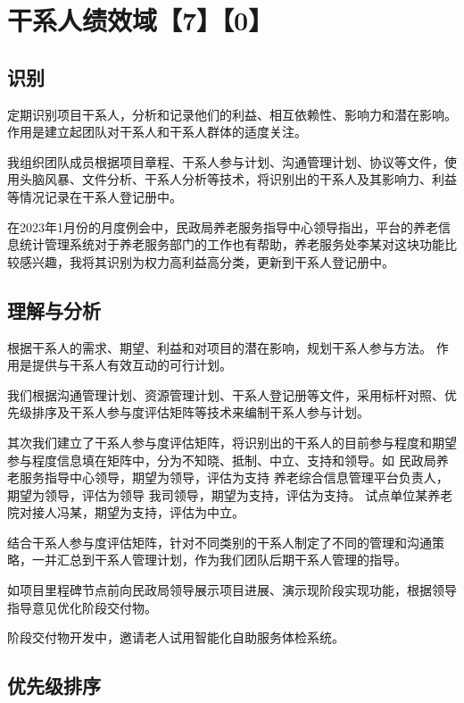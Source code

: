 \documentclass[UTF8]{../computerUniverse}
\begin{document}
\chapter{干系人绩效域【7】【0】}



\section{识别}

定期识别项目干系人，分析和记录他们的利益、相互依赖性、影响力和潜在影响。
作用是建立起团队对干系人和干系人群体的适度关注。

我组织团队成员根据项目章程、干系人参与计划、沟通管理计划、协议等文件，使用头脑风暴、文件分析、干系人分析等技术，将识别出的干系人及其影响力、利益等情况记录在干系人登记册中。



在2023年1月份的月度例会中，民政局养老服务指导中心领导指出，平台的养老信息统计管理系统对于养老服务部门的工作也有帮助，养老服务处李某对这块功能比较感兴趣，我将其识别为权力高利益高分类，更新到干系人登记册中。

\section{理解与分析}


根据干系人的需求、期望、利益和对项目的潜在影响，规划干系人参与方法。
作用是提供与干系人有效互动的可行计划。

我们根据沟通管理计划、资源管理计划、干系人登记册等文件，采用标杆对照、优先级排序及干系人参与度评估矩阵等技术来编制干系人参与计划。


其次我们建立了干系人参与度评估矩阵，将识别出的干系人的目前参与程度和期望参与程度信息填在矩阵中，分为不知晓、抵制、中立、支持和领导。如
民政局养老服务指导中心领导，期望为领导，评估为支持
养老综合信息管理平台负责人，期望为领导，评估为领导
我司领导，期望为支持，评估为支持。
试点单位某养老院对接人冯某，期望为支持，评估为中立。

结合干系人参与度评估矩阵，针对不同类别的干系人制定了不同的管理和沟通策略，一并汇总到干系人管理计划，作为我们团队后期干系人管理的指导。%

如项目里程碑节点前向民政局领导展示项目进展、演示现阶段实现功能，根据领导指导意见优化阶段交付物。

阶段交付物开发中，邀请老人试用智能化自助服务体检系统。


\section{优先级排序}
\end{document}
